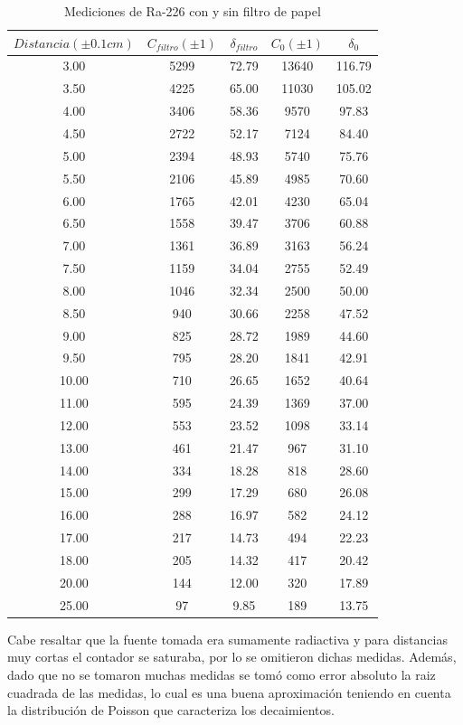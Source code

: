 \documentclass[%
 reprint,
 amsmath,amssymb,
 aps,
]{revtex4-1}
\begin{document}
\begin{table}[h!]
\centering
 \begin{tabular}{|c|c|c|c|c|} 
 \hline
 $Distancia(\pm0.1cm)$& $C_{filtro}(\pm1)$& $\delta_{filtro}$ & $C_{0}(\pm1)$ & $\delta_0$ \\ [0.5ex] 
 \hline\hline
 3.00&5299&72.79&13640&116.79\\
 3.50&4225&65.00&11030&105.02\\
 4.00&3406&58.36&9570&97.83\\
 4.50&2722&52.17&7124&84.40\\
 5.00&2394&48.93&5740&75.76\\
 5.50&2106&45.89&4985&70.60\\
 6.00&1765&42.01&4230&65.04\\
 6.50&1558&39.47&3706&60.88\\
 7.00&1361&36.89&3163&56.24\\
 7.50&1159&34.04&2755&52.49\\
 8.00&1046&32.34&2500&50.00\\
 8.50&940&30.66&2258&47.52\\
 9.00&825&28.72&1989&44.60\\
 9.50&795&28.20&1841&42.91\\
 10.00&710&26.65&1652&40.64\\
 11.00&595&24.39&1369&37.00\\
 12.00&553&23.52&1098&33.14\\
 13.00&461&21.47&967&31.10\\
 14.00&334&18.28&818&28.60\\
 15.00&299&17.29&680&26.08\\
 16.00&288&16.97&582&24.12\\
 17.00&217&14.73&494&22.23\\
 18.00&205&14.32&417&20.42\\
 20.00&144&12.00&320&17.89\\
 25.00&97&9.85&189&13.75\\
 [1ex] 
 \hline
 \end{tabular}
 \caption{Mediciones de Ra-226 con y sin filtro de papel}
 \label{table:alcance}
\end{table}

Cabe resaltar que la fuente tomada era sumamente radiactiva y para distancias muy cortas el contador se saturaba, por lo se omitieron dichas medidas. Además, dado que no se tomaron muchas medidas se tomó como error absoluto la raiz cuadrada de las medidas, lo cual es una buena aproximación teniendo en cuenta la distribución de Poisson que caracteriza los decaimientos.\\
\end{document}
